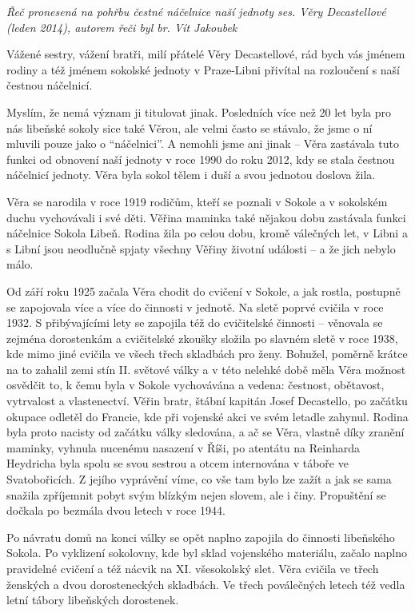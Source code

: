 \emph{Řeč pronesená na pohřbu čestné náčelnice naší jednoty ses. Věry
Decastellové (leden 2014), autorem řeči byl br. Vít Jakoubek}

Vážené sestry, vážení bratři, milí přátelé Věry Decastellové, rád bych
vás jménem rodiny a též jménem sokolské jednoty v Praze-Libni přivítal
na rozloučení s naší čestnou náčelnicí.

Myslím, že nemá význam ji titulovat jinak. Posledních více než 20 let
byla pro nás libeňské sokoly sice také Věrou, ale velmi často se
stávalo, že jsme o ní mluvili pouze jako o ``náčelnici''. A nemohli jsme
ani jinak -- Věra zastávala tuto funkci od obnovení naší jednoty v roce
1990 do roku 2012, kdy se stala čestnou náčelnicí jednoty. Věra byla
sokol tělem i duší a svou jednotou doslova žila.

Věra se narodila v roce 1919 rodičům, kteří se poznali v Sokole a v
sokolském duchu vychovávali i své děti. Věřina maminka také nějakou dobu
zastávala funkci náčelnice Sokola Libeň. Rodina žila po celou dobu,
kromě válečných let, v Libni a s Libní jsou neodlučně spjaty všechny
Věřiny životní události -- a že jich nebylo málo.

Od září roku 1925 začala Věra chodit do cvičení v Sokole, a jak rostla,
postupně se zapojovala více a více do činnosti v jednotě. Na sletě
poprvé cvičila v roce 1932. S přibývajícími lety se zapojila též do
cvičitelské činnosti -- věnovala se zejména dorostenkám a cvičitelské
zkoušky složila po slavném sletě v roce 1938, kde mimo jiné cvičila ve
všech třech skladbách pro ženy. Bohužel, poměrně krátce na to zahalil
zemi stín II. světové války a v této nelehké době měla Věra možnost
osvědčit to, k čemu byla v Sokole vychovávána a vedena: čestnost,
obětavost, vytrvalost a vlastenectví. Věřin bratr, štábní kapitán Josef
Decastello, po začátku okupace odletěl do Francie, kde při vojenské akci
ve svém letadle zahynul. Rodina byla proto nacisty od začátku války
sledována, a ač se Věra, vlastně díky zranění maminky, vyhnula nucenému
nasazení v Říši, po atentátu na Reinharda Heydricha byla spolu se svou
sestrou a otcem internována v táboře ve Svatobořicích. Z jejího
vyprávění víme, co vše tam bylo lze zažít a jak se sama snažila
zpříjemnit pobyt svým blízkým nejen slovem, ale i činy. Propuštění se
dočkala po bezmála dvou letech v roce 1944.

Po návratu domů na konci války se opět naplno zapojila do činnosti
libeňského Sokola. Po vyklizení sokolovny, kde byl sklad vojenského
materiálu, začalo naplno pravidelné cvičení a též nácvik na XI.
všesokolský slet. Věra cvičila ve třech ženských a dvou dorosteneckých
skladbách. Ve třech poválečných letech též vedla letní tábory libeňských
dorostenek.

